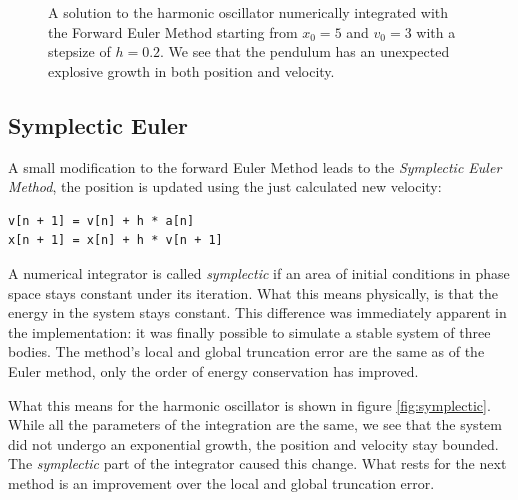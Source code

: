 \documentclass[a4paper]{article}
\begin{document}
\begin{figure}
\caption{A solution to the harmonic oscillator numerically integrated with the Forward Euler Method
  starting from $x_{0}=5$ and $v_{0}=3$ with a stepsize of $h=0.2$. We see that the pendulum has an
  unexpected explosive growth in both position and velocity.}
\label{fig:euler}
\end{figure}

\subsection{Symplectic Euler}
A small modification to the forward Euler Method leads to the \textit{Symplectic Euler Method}, the
position is updated using the just calculated new velocity:
\begin{verbatim}
v[n + 1] = v[n] + h * a[n]
x[n + 1] = x[n] + h * v[n + 1]
\end{verbatim}
A numerical integrator is called \textit{symplectic} if an area of initial conditions in phase space
stays constant under its iteration. What this means physically, is that the energy in the system
stays constant. This difference was immediately apparent in the implementation: it was finally
possible to simulate a stable system of three bodies. The method's local and global truncation error
are the same as of the Euler method, only the order of energy conservation has improved.

What this means for the harmonic oscillator is shown in figure \ref{fig:symplectic}. While all the
parameters of the integration are the same, we see that the system did not undergo an exponential
growth, the position and velocity stay bounded. The \textit{symplectic} part of the integrator
caused this change. What rests for the next method is an improvement over the local and global
truncation error.
\end{document}
